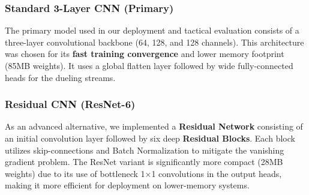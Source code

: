\documentclass[9pt,a4paper,twocolumn,twoside]{rho-class/rho}
\begin{document}
        \subsubsection{Standard 3-Layer CNN (Primary)}
            The primary model used in our deployment and tactical evaluation consists of a three-layer convolutional backbone (64, 128, and 128 channels). This architecture was chosen for its \textbf{fast training convergence} and lower memory footprint (85MB weights). It uses a global flatten layer followed by wide fully-connected heads for the dueling streams.
            
        \subsubsection{Residual CNN (ResNet-6)}
            As an advanced alternative, we implemented a \textbf{Residual Network} consisting of an initial convolution layer followed by six deep \textbf{Residual Blocks}. Each block utilizes skip-connections and Batch Normalization to mitigate the vanishing gradient problem. The ResNet variant is significantly more compact (28MB weights) due to its use of bottleneck 1$\times$1 convolutions in the output heads, making it more efficient for deployment on lower-memory systems.
\end{document}
